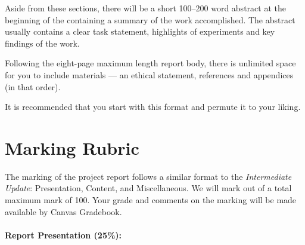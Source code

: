 \documentclass[11pt]{article}
\begin{document}
\noindent Aside from these sections, there will be a short 100--200 word abstract at the beginning of the containing a summary of the work accomplished.  The abstract usually contains a clear task statement, highlights of experiments and key findings of the work.  

Following the eight-page maximum length report body, there is unlimited space for you to include materials --- an ethical statement, references and appendices (in that order). 

It is recommended that you start with this format and permute it to your liking.


\section{Marking Rubric}

The marking of the project report follows a similar format to the {\it Intermediate Update}: Presentation, Content, and Miscellaneous.  We will mark out of a total maximum mark of 100.  Your grade and comments on the marking will be made available by Canvas Gradebook.

\paragraph{Report Presentation (25\%):}
\end{document}
